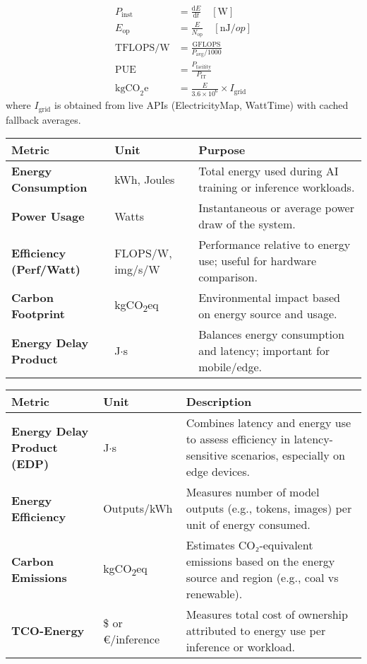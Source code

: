 \begin{align}
  P_{\text{inst}}         &= \frac{\mathrm{d}E}{\mathrm{d}t} \quad [\si{\watt}] \\
  E_{\text{op}}           &= \frac{E}{N_{\text{op}}} \quad [\si{\nano\joule\per op}] \\
  \text{TFLOPS/W}         &= \frac{\text{GFLOPS}}{P_{\text{avg}}/1000} \\
  \text{PUE}              &= \frac{P_{\text{facility}}}{P_{\text{IT}}} \\
  \text{kgCO}_{2}\text{e} &= \frac{E}{3.6\times 10^{6}}\times I_{\text{grid}}
\end{align}
where $I_{\text{grid}}$ %
is obtained from live APIs (ElectricityMap, WattTime) with cached fallback averages.


\begin{table*}[htb]
\caption{TODO}
\label{tab:energy-list}
\begin{tabularx}{\textwidth}{>{\bfseries}l l X}
\toprule
Metric & Unit & Purpose \\
\midrule
Energy Consumption & kWh, Joules & Total energy used during AI training or inference workloads. \\
Power Usage        & Watts       & Instantaneous or average power draw of the system. \\
Efficiency (Perf/Watt) & FLOPS/W, img/s/W & Performance relative to energy use; useful for hardware comparison. \\
Carbon Footprint   & kgCO\textsubscript{2}eq & Environmental impact based on energy source and usage. \\
Energy Delay Product & J$\cdot$s & Balances energy consumption and latency; important for mobile/edge. \\
\bottomrule
\end{tabularx}

\caption{Energy metrics in elationship to AI}

\begin{tabularx}{\textwidth}{>{\bfseries}l l X}
\toprule
Metric & Unit & Description \\
\midrule
Energy Delay Product (EDP) & J$\cdot$s & Combines latency and energy use to assess efficiency in latency-sensitive scenarios, especially on edge devices. \\
Energy Efficiency           & Outputs/kWh & Measures number of model outputs (e.g., tokens, images) per unit of energy consumed. \\
Carbon Emissions            & kgCO\textsubscript{2}eq & Estimates CO₂-equivalent emissions based on the energy source and region (e.g., coal vs renewable). \\
TCO-Energy                  & \$ or €/inference & Measures total cost of ownership attributed to energy use per inference or workload. \\
\bottomrule
\end{tabularx}

\end{table*}



